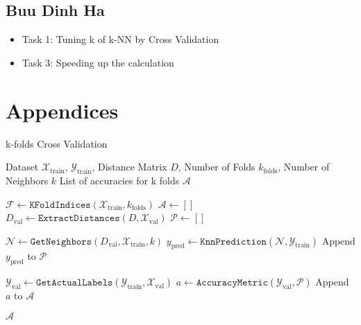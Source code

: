 \documentclass{article}
\theoremstyle{plain}
\theoremstyle{definition}
\theoremstyle{remark}
\begin{document}
\subsection{Buu Dinh Ha}
\begin{itemize}
    \item Task 1: Tuning k of k-NN by Cross Validation
    \item Task 3: Speeding up the calculation
\end{itemize}

\nocite{langley00}




\newpage
\appendix
\onecolumn
\section{Appendices}


\begin{algorithm}[tb]
   \caption{k-folds Cross Validation}
   \label{alg:k_folds_cross_validation}
\begin{algorithmic}
    Dataset $\mathcal{X}_{\text{train}}$, $\mathcal{Y}_{\text{train}}$, Distance Matrix $D$, Number of Folds $k_{\text{folds}}$, Number of Neighbors $k$
    List of accuracies for k folds $\mathcal{A}$

   \STATE $\mathcal{F} \gets \texttt{KFoldIndices}(\mathcal{X}_{\text{train}}, k_{\text{folds}})$
   \STATE $\mathcal{A} \gets []$
      \STATE $D_{\text{val}} \gets \texttt{ExtractDistances}(D, \mathcal{X}_{\text{val}})$
      \STATE $\mathcal{P} \gets []$

         \STATE $\mathcal{N} \gets \texttt{GetNeighbors}(D_{\text{val}}, \mathcal{X}_{\text{train}}, k)$
         \STATE $y_{\text{pred}} \gets \texttt{KnnPrediction}(\mathcal{N}, \mathcal{Y}_{\text{train}})$
         \STATE Append $y_{\text{pred}}$ to $\mathcal{P}$
      \ENDFOR

      \STATE $\mathcal{Y}_{\text{val}} \gets \texttt{GetActualLabels}(\mathcal{Y}_{\text{train}}, \mathcal{X}_{\text{val}})$
      \STATE $a \gets \texttt{AccuracyMetric}(\mathcal{Y}_{\text{val}}, \mathcal{P})$
      \STATE Append $a$ to $\mathcal{A}$
   \ENDFOR

    $\mathcal{A}$
\end{algorithmic}
\end{algorithm}
\end{document}
